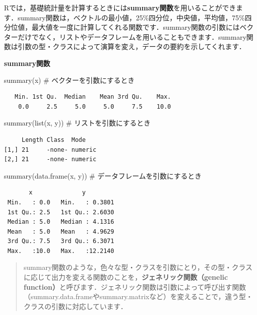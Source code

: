 \documentclass[
  letterpaper,
  DIV=11,
  numbers=noendperiod]{scrreprt}
\newenvironment{Shaded}{\begin{snugshade}}{\end{snugshade}}
\newcommand{\CommentTok}[1]{\textcolor[rgb]{0.37,0.37,0.37}{#1}}
\newcommand{\FunctionTok}[1]{\textcolor[rgb]{0.28,0.35,0.67}{#1}}
\newcommand{\NormalTok}[1]{\textcolor[rgb]{0.00,0.23,0.31}{#1}}
\begin{document}
Rでは，基礎統計量を計算するときには\textbf{summary関数}を用いることができます．summary関数は，ベクトルの最小値，25\%四分位，中央値，平均値，75\%四分位値，最大値を一度に計算してくれる関数です．summary関数の引数にはベクターだけでなく，リストやデータフレームを用いることもできます．summary関数は引数の型・クラスによって演算を変え，データの要約を示してくれます．

\textbf{summary関数}

\begin{Shaded}
\begin{Highlighting}[]
\FunctionTok{summary}\NormalTok{(x) }\CommentTok{\# ベクターを引数にするとき}
\end{Highlighting}
\end{Shaded}

\begin{verbatim}
   Min. 1st Qu.  Median    Mean 3rd Qu.    Max. 
    0.0     2.5     5.0     5.0     7.5    10.0 
\end{verbatim}

\begin{Shaded}
\begin{Highlighting}[]
\FunctionTok{summary}\NormalTok{(}\FunctionTok{list}\NormalTok{(x, y)) }\CommentTok{\# リストを引数にするとき}
\end{Highlighting}
\end{Shaded}

\begin{verbatim}
     Length Class  Mode   
[1,] 21     -none- numeric
[2,] 21     -none- numeric
\end{verbatim}

\begin{Shaded}
\begin{Highlighting}[]
\FunctionTok{summary}\NormalTok{(}\FunctionTok{data.frame}\NormalTok{(x, y)) }\CommentTok{\# データフレームを引数にするとき}
\end{Highlighting}
\end{Shaded}

\begin{verbatim}
       x              y          
 Min.   : 0.0   Min.   : 0.3801  
 1st Qu.: 2.5   1st Qu.: 2.6030  
 Median : 5.0   Median : 4.1316  
 Mean   : 5.0   Mean   : 4.9629  
 3rd Qu.: 7.5   3rd Qu.: 6.3071  
 Max.   :10.0   Max.   :12.2140  
\end{verbatim}

\begin{quote}
summary関数のような，色々な型・クラスを引数にとり，その型・クラスに応じて出力を変える関数のことを，\textbf{ジェネリック関数（genelic
function）}と呼びます．ジェネリック関数は引数によって呼び出す関数（summary.data.frameやsummary.matrixなど）を変えることで，違う型・クラスの引数に対応しています．
\end{quote}
\end{document}

